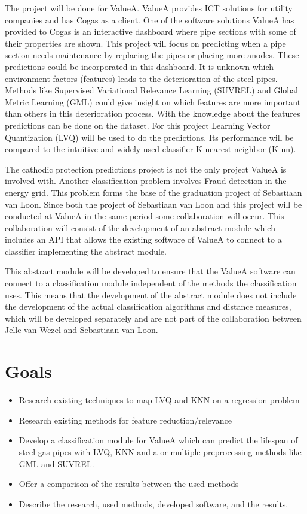 The project will be done for ValueA. ValueA provides ICT solutions for utility companies and has Cogas as a client. One of the software solutions ValueA has provided to Cogas is an interactive dashboard where pipe sections with some of their properties are shown. This project will focus on predicting when a pipe section needs maintenance by replacing the pipes or placing more anodes. These predictions could be incorporated in this dashboard.
It is unknown which environment factors (features) leads to the deterioration of the steel pipes. Methods like Supervised Variational Relevance Learning (SUVREL) and Global Metric Learning (GML) could give insight on which features are more important than others in this deterioration process. With the knowledge about the features predictions can be done on the dataset. For this project Learning Vector Quantization (LVQ) will be used to do the predictions. Its performance will be compared to the intuitive and widely used classifier K nearest neighbor (K-nn).

The cathodic protection predictions project is not the only project ValueA is involved with. Another classification problem involves Fraud detection in the energy grid. This problem forms the base of the graduation project of Sebastiaan van Loon. Since both the project of Sebastiaan van Loon and this project will be conducted at ValueA in the same period some collaboration will occur. This collaboration will consist of the development of an abstract module which includes an API that allows the existing software of ValueA to connect to a classifier implementing the abstract module.

This abstract module will be developed to ensure that the ValueA software can connect to a classification module independent of the methods the classification uses. This means that the development of the abstract module does not include the development of the actual classification algorithms and distance measures, which will be developed separately and are not part of the collaboration between Jelle van Wezel and Sebastiaan van Loon.

\section{Goals}

\begin{itemize}
\item Research existing techniques to map LVQ and KNN on a regression problem
\item Research existing methods for feature reduction/relevance
\item Develop a classification module for ValueA which can predict the lifespan of steel gas pipes with LVQ, KNN and a or multiple preprocessing methods like GML and SUVREL.
\item Offer a comparison of the results between the used methods
\item Describe the research, used methods, developed software, and the results.
\end{itemize}

